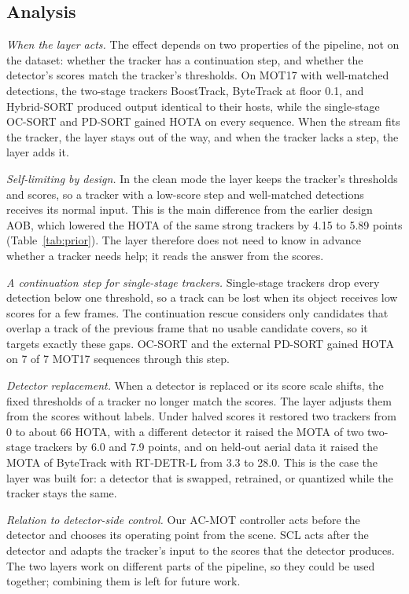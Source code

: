 \documentclass[pdflatex,referee,sn-mathphys-num]{sn-jnl}
\newcommand{\scl}{SCL}
\newcommand{\aob}{AOB}
\begin{document}
\subsection{Analysis}\label{sec:discussion}

\emph{When the layer acts.} The effect depends on two properties of the
pipeline, not on the dataset: whether the tracker has a continuation step,
and whether the detector's scores match the tracker's thresholds. On MOT17
with well-matched detections, the two-stage trackers BoostTrack, ByteTrack at
floor 0.1, and Hybrid-SORT produced output identical to their hosts, while
the single-stage OC-SORT and PD-SORT gained HOTA on every sequence. When the
stream fits the tracker, the layer stays out of the way, and when the
tracker lacks a step, the layer adds it.

\emph{Self-limiting by design.} In the clean mode the layer keeps the
tracker's thresholds and scores, so a tracker with a low-score step and
well-matched detections receives its normal input. This is the main
difference from the earlier design \aob{}, which lowered the HOTA of the same
strong trackers by 4.15 to 5.89 points (Table~\ref{tab:prior}). The layer
therefore does not need to know in advance whether a tracker needs help; it
reads the answer from the scores.

\emph{A continuation step for single-stage trackers.} Single-stage trackers
drop every detection below one threshold, so a track can be lost when its
object receives low scores for a few frames. The continuation rescue
considers only candidates that overlap a track of the previous frame that no
usable candidate covers, so it targets exactly these gaps. OC-SORT and the
external PD-SORT gained HOTA on 7 of 7 MOT17 sequences through this step.

\emph{Detector replacement.} When a detector is replaced or its score scale
shifts, the fixed thresholds of a tracker no longer match the scores. The
layer adjusts them from the scores without labels. Under halved scores it
restored two trackers from 0 to about 66 HOTA, with a different detector
it raised the MOTA of two two-stage trackers by 6.0 and 7.9 points, and on
held-out aerial data it raised the MOTA of ByteTrack with RT-DETR-L from 3.3
to 28.0. This is
the case the layer was built for: a detector that is swapped, retrained, or
quantized while the tracker stays the same.

\emph{Relation to detector-side control.} Our AC-MOT controller acts
before the detector and chooses its operating point from the scene. \scl{}
acts after the detector and adapts the tracker's input to the scores that the
detector produces. The two layers work on different parts of the pipeline,
so they could be used together; combining them is left for future work.
\end{document}
